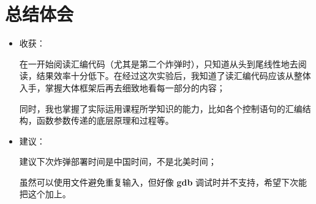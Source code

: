 \section{总结体会}
    \begin{itemize}
        \item 收获：
            \par 在一开始阅读汇编代码（尤其是第二个炸弹时），只知道从头到尾线性地去阅读，结果效率十分低下。在经过这次实验后，我知道了读汇编代码应该从整体入手，掌握大体框架后再去细致地看每一部分的内容；
            \par 同时，我也掌握了实际运用课程所学知识的能力，比如各个控制语句的汇编结构，函数参数传递的底层原理和过程等。
        \item 建议：
            \par 建议下次炸弹部署时间是中国时间，不是北美时间；
            \par 虽然可以使用文件避免重复输入，但好像 \textbf{gdb} 调试时并不支持，希望下次能把这个加上。

    \end{itemize} 